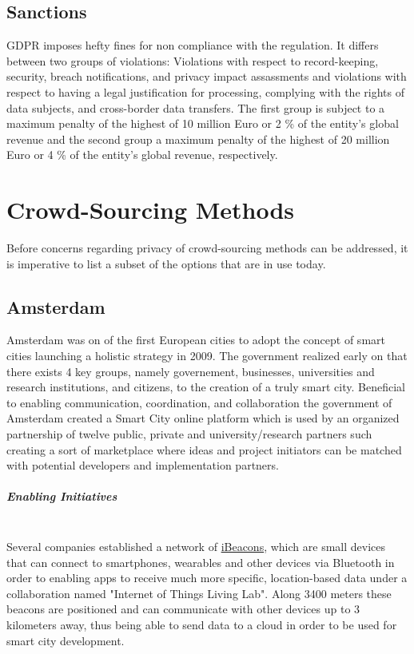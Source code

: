 \documentclass[a4paper,12pt]{report}
\begin{document}
	\section{Sanctions}
	\startsection
	GDPR imposes hefty fines for non compliance with the regulation.
	It differs between two groups of violations: Violations with respect to record-keeping, security, breach notifications, and privacy impact assassments and violations with respect to having a legal justification for processing, complying with the rights of data subjects, and cross-border data transfers.
	The first group is subject to a maximum penalty of the highest of 10 million Euro or 2 \% of the entity's global revenue and the second group a maximum penalty of the highest of 20 million Euro or 4 \% of the entity's global revenue, respectively.
	\closesection
	
	
	\chapter{Crowd-Sourcing Methods} \label{Crowd-Sourcing Methods}
	Before concerns regarding privacy of crowd-sourcing methods can be addressed, it is imperative to list a subset of the options that are in use today.
	
	\section[Amsterdam]{Amsterdam \cite{SmartCityAmsterdam}} \label{Amsterdam}
	\startsection
		Amsterdam was on of the first European cities to adopt the concept of smart cities launching a holistic strategy in 2009. The government realized early on that there exists 4 key groups, namely governement, businesses, universities and research institutions, and citizens, to the creation of a truly smart city. Beneficial to enabling communication, coordination, and collaboration the government of Amsterdam created a Smart City online platform which is used by an organized partnership of twelve public, private and university/research partners such creating a sort of marketplace where ideas and project initiators can be matched with potential developers and implementation partners.
		\paragraph{Enabling Initiatives} \hfill \\
		Several companies established a network of \href{https://www.yenlo.com/blogs/ibeacon-testing-ground-first-lora-network/}{iBeacons}, which are small devices that can connect to smartphones, wearables and other devices via Bluetooth in order to enabling apps to receive much more specific, location-based data under a collaboration named "Internet of Things Living Lab". Along 3400 meters these beacons are positioned and can communicate with other devices up to 3 kilometers away, thus being able to send data to a cloud in order to be used for smart city development.
\end{document}
